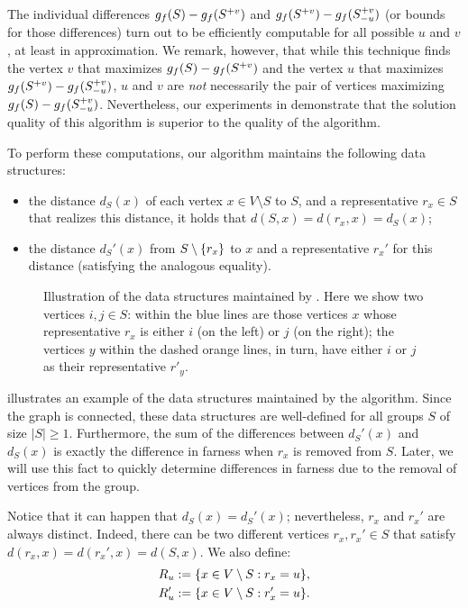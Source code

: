 The individual differences $g_f(S) - g_f(S^{+v})$ and $g_f(S^{+v}) - g_f(S_{-u}^{+v})$
(or bounds for those differences) turn out to be efficiently computable for all
possible $u$ and $v$, at least in approximation. We remark, however, that while
this technique finds the vertex $v$ that maximizes $g_f(S) - g_f(S^{+v})$
and the vertex $u$ that maximizes $g_f(S^{+v}) - g_f(S_{-u}^{+v})$, $u$ and $v$ are
\emph{not} necessarily the pair of vertices maximizing $g_f(S) -
g_f(S_{-u}^{+v})$. Nevertheless, our experiments in 
demonstrate that the solution quality of this algorithm is superior to the
quality of the \localswaps algorithm.

To perform these computations, our algorithm maintains the following data structures:
\begin{itemize}
    \item the distance $d_S(x)$ of each vertex $x\in V\setminus S$ to $S$, and a
        representative $r_x\in S$ that realizes this distance, \ie
        it holds that $d(S, x) = d(r_x, x) = d_S(x)$;
    \item the distance $d_S'(x)$ from $S\setminus\set{r_x}$ to $x$ and a
        representative $r_x'$ for this distance (satisfying the analogous
        equality).
\end{itemize}

\begin{figure}[t]
\centering

\caption{Illustration of the data structures maintained by \growshrink.
Here we show two vertices $i, j\in S$: within the blue lines
are those vertices $x$ whose representative $r_x$ is either $i$ (on the left)
or $j$ (on the right); the vertices $y$ within the dashed orange lines, in turn,
have either $i$ or $j$ as their representative $r'_y$.}
\label{fig:grow-shrink-ds}
\end{figure}

 illustrates an example of the data structures maintained
by the \growshrink algorithm.
Since the graph is connected, these data structures are well-defined for all
groups $S$ of size $|S| \ge 1$.
Furthermore, the sum of the differences between $d_S'(x)$ and $d_S(x)$ is exactly
the difference in farness when $r_x$ is removed from $S$. Later, we will use
this fact to quickly determine differences in farness due to the removal of
vertices from the group.

Notice that it can happen that $d_S(x) = d_S'(x)$; nevertheless, $r_x$ and
$r_x'$ are always distinct. Indeed, there can be two different vertices
$r_x,r_x' \in S$ that satisfy $d(r_x, x) = d(r_x', x) = d(S, x)$.
We also define:
%
\begin{align*}
    R_u  &:= \set{x \in V\setminus S : r_x = u},\\
    R_u' &:= \set{x \in V\setminus S : r_x' = u}.
\end{align*}

